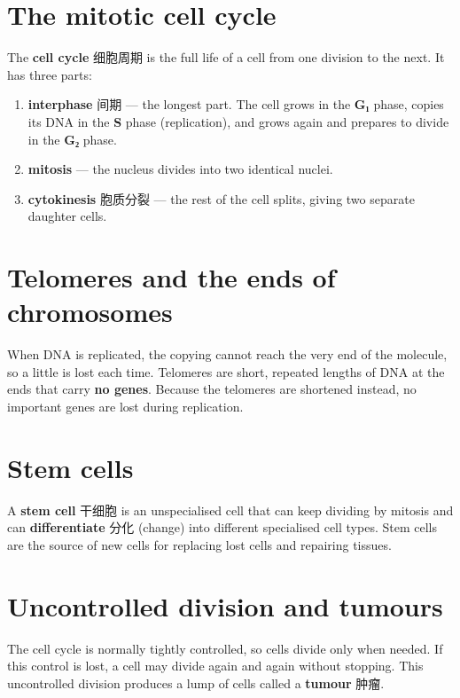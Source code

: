 \documentclass[11pt]{article}
\begin{document}
\section*{The mitotic cell cycle}

The \textbf{cell cycle} 细胞周期 is the full life of a cell from one division to the next. It has three parts:

\begin{enumerate}
\item \textbf{interphase} 间期 — the longest part. The cell grows in the \textbf{G₁} phase, copies its DNA in the \textbf{S} phase (replication), and grows again and prepares to divide in the \textbf{G₂} phase.

\item \textbf{mitosis} — the nucleus divides into two identical nuclei.

\item \textbf{cytokinesis} 胞质分裂 — the rest of the cell splits, giving two separate daughter cells.

\end{enumerate}

\section*{Telomeres and the ends of chromosomes}

When DNA is replicated, the copying cannot reach the very end of the molecule, so a little is lost each time. Telomeres are short, repeated lengths of DNA at the ends that carry \textbf{no genes}. Because the telomeres are shortened instead, no important genes are lost during replication.

\section*{Stem cells}

A \textbf{stem cell} 干细胞 is an unspecialised cell that can keep dividing by mitosis and can \textbf{differentiate} 分化 (change) into different specialised cell types. Stem cells are the source of new cells for replacing lost cells and repairing tissues.

\section*{Uncontrolled division and tumours}

The cell cycle is normally tightly controlled, so cells divide only when needed. If this control is lost, a cell may divide again and again without stopping. This uncontrolled division produces a lump of cells called a \textbf{tumour} 肿瘤.
\end{document}
